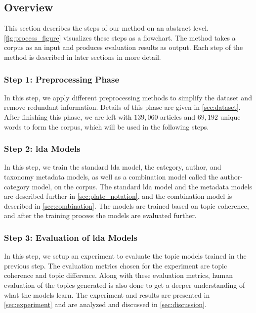 \subsection{Overview}\label{sec:overview}
This section describes the steps of our method on an abstract level.
\autoref{fig:process_figure} visualizes these steps as a flowchart.
The method takes a corpus as an input and produces evaluation results as output.
Each step of the method is described in later sections in more detail.

\subsubsection*{Step 1: Preprocessing Phase}
In this step, we apply different preprocessing methods to simplify the dataset and remove redundant information.
Details of this phase are given in \autoref{sec:dataset}.
After finishing this phase, we are left with $139,060$ articles and $69,192$ unique words to form the corpus, which will be used in the following steps.

\subsubsection*{Step 2: \Gls{lda} Models}
In this step, we train the standard \gls{lda} model, the category, author, and taxonomy metadata models, as well as a combination model called the author-category model, on the corpus.
The standard \gls{lda} model and the metadata models are described further in \autoref{sec:plate_notation}, and the combination model is described in \autoref{sec:combination}.
The models are trained based on topic coherence, and after the training process the models are evaluated further.

\subsubsection*{Step 3: Evaluation of \gls{lda} Models}
In this step, we setup an experiment to evaluate the topic models trained in the previous step.
The evaluation metrics chosen for the experiment are topic coherence and topic difference.
Along with these evaluation metrics, human evaluation of the topics generated is also done to get a deeper understanding of what the models learn.
The experiment and results are presented in \autoref{sec:experiment} and are analyzed and discussed in \autoref{sec:discussion}.



